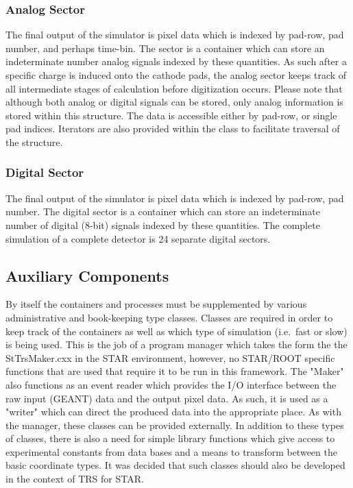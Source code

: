 \documentclass[twoside]{article}
\newcommand{\name}[1]{\textsf{#1}}%
\begin{document}
\subsubsection{Analog Sector}
\label{sec:sector}

The final output of the simulator is pixel data which is indexed
by pad-row, pad number, and perhaps time-bin.  The sector is
a container which can store an indeterminate number analog signals
indexed by these quantities.  As such after a specific charge is induced
onto the cathode pads, the analog sector keeps track of all intermediate
stages of calculation before digitization occurs.  
Please note that although both analog or
digital signals can be stored, only analog information is stored within
this structure.  The data is accessible either
by pad-row, or single pad indices.  Iterators are also provided within
the class to facilitate traversal of the structure.  

\subsubsection{Digital Sector}
\label{sec:digitalSector}

The final output of the simulator is pixel data which is indexed
by pad-row, pad number.  The digital sector is
a container which can store an indeterminate number of digital (8-bit) signals
indexed by these quantities.  The complete simulation of a complete
detector is 24 separate digital sectors.

\subsection{Auxiliary Components}

By itself the containers and processes must be supplemented by
various administrative and book-keeping type classes.
Classes are required in order to keep track of the containers 
as well as which type of simulation (i.e.~fast or slow) is being used.  
This is the job of a program manager which takes the form the 
the \name{StTrsMaker.cxx} in the STAR environment, however,
no STAR/ROOT specific functions that are used that require it
to be run in this framework.  The "Maker" also functions as
an event reader which provides the I/O interface between the
raw input (GEANT) data and the output pixel data.  As such, it
is used as a "writer" which can direct the produced data
into the appropriate place.  As with the manager, these classes
can be provided externally.  In addition to these types of classes,
there is also a need for simple library functions which give
access to experimental constants from data bases and a means to
transform between the basic coordinate types.  It was decided that
such classes should also be developed in the context of \name{TRS} for
STAR.
\end{document}
